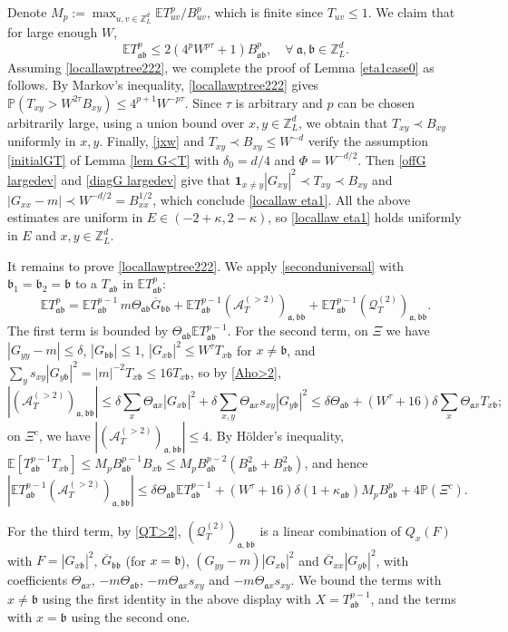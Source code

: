\documentclass{article}
\newcommand{\1}{\mathds{1}}
\numberwithin{equation}{section}
\newcommand{\be}{\begin{equation}}
\newcommand{\ee}{\end{equation}}
\newcommand{\fa}{{\mathfrak a}}
\newcommand{\fb}{{\mathfrak b}}
\renewcommand{\leq}{\leqslant}
\renewcommand{\le}{\leq}
\renewcommand{\P}{\mathbb{P}}
\newcommand{\E}{\mathbb{E}}
\newcommand{\Z}{\mathbb{Z}}
\theoremstyle{plain} %
\theoremstyle{remark}
\newcommand{\QT}{\mathcal Q_T}
\newcommand{\AT}{\mathcal A_T}
\begin{document}
Denote $M_p:=\max_{u,v\in \Z_L^d}\E T_{uv}^p/B_{uv}^p$, which is finite since $T_{uv}\le 1$. We claim that for large enough $W$,
\be\label{locallawptree222}
\E T_{\fa\fb}^p \le 2\left(4^pW^{p\tau}+1\right) B_{\fa\fb}^p ,\quad \forall\ \fa,\fb\in \Z_L^d.
\ee
Assuming \eqref{locallawptree222}, we complete the proof of Lemma \ref{eta1case0} as follows. By Markov's inequality, \eqref{locallawptree222} gives $\P(T_{xy}> W^{2\tau}B_{xy})\le 4^{p+1}W^{-p\tau}$. Since $\tau$ is arbitrary and $p$ can be chosen arbitrarily large, using a union bound over $x,y\in \Z_L^d$, we obtain that $T_{xy}\prec B_{xy}$ uniformly in $x,y$. Finally, \eqref{jxw} and $T_{xy}\prec B_{xy}\le W^{-d}$ verify the assumption \eqref{initialGT} of Lemma \ref{lem G<T} with $\delta_0=d/4$ and $\Phi=W^{-d/2}$. Then \eqref{offG largedev} and \eqref{diagG largedev} give that $\mathbf 1_{x\ne y}|G_{xy}|^2\prec T_{xy}\prec B_{xy}$ and $|G_{xx}-m|\prec W^{-d/2}=B_{xx}^{1/2}$, which conclude \eqref{locallaw eta1}. All the above estimates are uniform in $E\in(-2+\kappa,2-\kappa)$, so \eqref{locallaw eta1} holds uniformly in $E$ and $x,y\in \Z_L^d$.

It remains to prove \eqref{locallawptree222}. We apply \eqref{seconduniversal} with $\fb_1=\fb_2=\fb$ to a $T_{\fa\fb}$ in $\E T_{\fa\fb}^p$:
\be\label{eta1 exp}
\E T_{\fa\fb}^p=\E T^{p-1}_{\fa\fb}\, m\Theta_{\fa\fb}\overline G_{\fb\fb}+\E T^{p-1}_{\fa\fb}(\AT^{(>2)})_{\fa,\fb\fb}+\E T^{p-1}_{\fa\fb}(\QT^{(2)})_{\fa,\fb\fb}.
\ee
The first term is bounded by $\Theta_{\fa\fb}\E T_{\fa\fb}^{p-1}$. For the second term, on $\Xi$ we have $|G_{yy}-m|\le \delta$, $|G_{\fb\fb}|\le 1$, $|G_{x\fb}|^2\le W^\tau T_{x\fb}$ for $x\ne \fb$, and $\sum_y s_{xy}|G_{y\fb}|^2=|m|^{-2}T_{x\fb}\le 16T_{x\fb}$, so by \eqref{Aho>2},
$$|(\AT^{(>2)})_{\fa,\fb\fb}|\le \delta\sum_x\Theta_{\fa x}|G_{x\fb}|^2+\delta\sum_{x,y}\Theta_{\fa x}s_{xy}|G_{y\fb}|^2\le \delta\Theta_{\fa\fb}+(W^\tau+16)\delta\sum_x\Theta_{\fa x}T_{x\fb};$$
on $\Xi^c$, we have $|(\AT^{(>2)})_{\fa,\fb\fb}|\le 4$. By H\"older's inequality, $\E[T_{\fa\fb}^{p-1}T_{x\fb}]\le M_pB_{\fa\fb}^{p-1}B_{x\fb}\le M_pB_{\fa\fb}^{p-2}(B_{\fa\fb}^2+B_{x\fb}^2)$, and hence
$$\left|\E T^{p-1}_{\fa\fb}(\AT^{(>2)})_{\fa,\fb\fb}\right|\le \delta\Theta_{\fa\fb}\E T_{\fa\fb}^{p-1}+(W^\tau+16)\delta(1+\kappa_{\fa\fb})M_pB_{\fa\fb}^p+4\P(\Xi^c).$$

For the third term, by \eqref{QT>2}, $(\QT^{(2)})_{\fa,\fb\fb}$ is a linear combination of $Q_x(F)$ with $F=|G_{x\fb}|^2$, $\overline G_{\fb\fb}$ (for $x=\fb$), $(G_{yy}-m)|G_{x\fb}|^2$ and $\overline G_{xx}|G_{y\fb}|^2$, with coefficients $\Theta_{\fa x}$, $-m\Theta_{\fa \fb}$, $-m\Theta_{\fa x}s_{xy}$ and $-m\Theta_{\fa x}s_{xy}$. We bound the terms with $x\ne \fb$ using the first identity in the above display with $X=T_{\fa\fb}^{p-1}$, and the terms with $x=\fb$ using the second one. 
\end{document}
